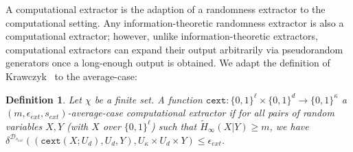 \documentclass[11pt]{article}
\newcommand{\defref}[1]{\mbox{Definition~\ref{#1}}}
\newcommand{\class}[1]{{\ensuremath{\mathsf{#1}}}}
\newcommand{\gen}{\ensuremath{\class{Gen}}\xspace}
\newcommand{\rep}{\ensuremath{\class{Rep}}\xspace}
\newcommand{\zo}{\ensuremath{\{0, 1\}}}
\newcommand{\dis}{\ensuremath{\mathsf{dis}}}
\newcommand{\hill}{\ensuremath{\mathtt{HILL}}\xspace}
\newcommand{\cext}{\ensuremath{\mathtt{cext}}}
\newtheorem{definition}[theorem]{Definition}
\begin{document}
\iffalse
\begin{definition}
\label{def:comp fuzzy cond}
Let $\mathcal{W}$ be a family of probability distributions over $\mathcal{M}$.  A pair of randomized procedures ``generate'' ($\gen$) and ``reproduce'' ($\rep$) is an $(\mathcal{M}, \mathcal{W}, \tilde{m}, t$)-computational fuzzy conductor that is $(\epsilon, s)$-hard with error $\delta$ if $\gen$ and $\rep$ satisfy the following properties (the first two properties are the same as in \defref{def:comp fuzzy extractor}, with $x$ replacing $r$):
\begin{itemize}
\item The generate procedure $\gen$ on input $w\in \mathcal{M}$ outputs a string $x\in\{0,1\}^\ell$ and a helper string $p\in\{0,1\}^*$.
\item The reproduction procedure $\rep$ takes an element $w'\in\mathcal{M}$ and a bit string $p\in\{0,1\}^*$ as inputs.  The \emph{correctness} property guarantees that if $\dis(w, w')\leq t$ and $(x, p)\leftarrow \gen(w)$, then $\Pr[\rep(w',p) = x] \geq 1-\delta$ where the probability is over the randomness of $(\gen, \rep)$.
If $\dis(w, w') > t$, then no guarantee is provided about the output of $\rep$.
\item The \emph{security} property guarantees that for any distribution $W\in \mathcal{W}$, the string $x$ has high HILL entropy conditioned on $P$.  That is $H^{\hill}_{\epsilon_{cond}, s_{cond}}(X |P)\geq \tilde{m}$.
\end{itemize}
\end{definition}
\fi 

A computational extractor is the adaption of a randomness extractor to the computational setting.  Any information-theoretic randomness extractor is also a computational extractor; however, unlike information-theoretic extractors, computational extractors can expand their output arbitrarily via pseudorandom generators once a long-enough output is obtained. We adapt the definition of Krawczyk~\cite{krawczyk2010cryptographic} to the average-case:
\begin{definition}
Let $\chi$ be a finite set.
A function $\cext: \zo^\ell \times \{0,1\}^d \rightarrow \{0,1\}^\kappa$ a \emph{$(m, \epsilon_{ext}, s_{ext})$-average-case computational extractor} if for all pairs
of random variables $X, Y$ (with $X$ over $\zo^\ell$) such that
$\tilde{H}_\infty(X|Y) \ge m$, we have $\delta^{\mathcal{D}_{s_{ext}}}((\cext(X; U_d), U_d, Y), U_\kappa\times
U_d \times Y) \le \epsilon_{ext}$.
\end{definition}
\end{document}
